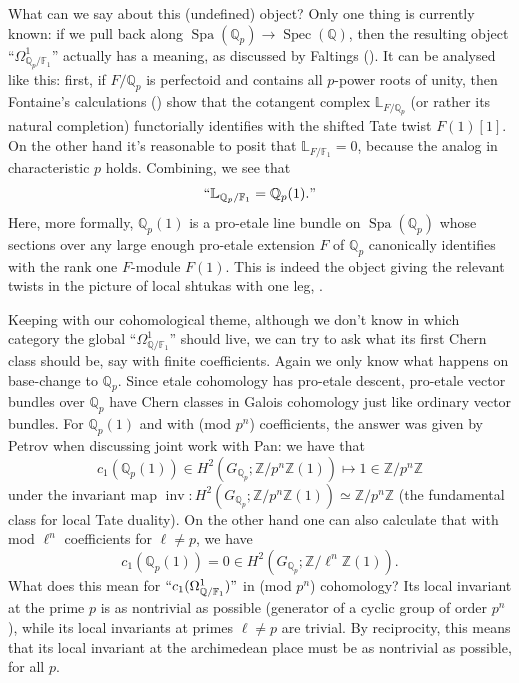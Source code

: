 \documentclass[12pt]{article}
\theoremstyle{definition}
\newcommand{\on}{\operatorname}
\newcommand{\mbb}{\mathbb}
\begin{document}
\begin{enumerate}
What can we say about this (undefined) object? Only one thing is currently known: if we pull back along $\on{Spa}(\mbb{Q}_p)\to \on{Spec}(\mbb{Q})$, then the resulting object ``$\Omega^1_{\mbb{Q}_p/\mbb{F}_1}$'' actually has a meaning, as discussed by Faltings (\cite{faltings}).  It can be analysed like this: first, if $F/\mbb{Q}_p$ is perfectoid and contains all $p$-power roots of unity, then Fontaine's calculations (\cite{fontaine}) show that the cotangent complex $\mbb{L}_{F/\mbb{Q}_p}$ (or rather its natural completion) functorially identifies with the shifted Tate twist $F(1)[1]$.  On the other hand it's reasonable to posit that $\mbb{L}_{F/\mbb{F}_1}=0$, because the analog in characteristic $p$ holds.  Combining, we see that
$$``\mbb{L}_{\mbb{Q}_p/\mbb{F}_1} = \mbb{Q}_p(1)."$$
Here, more formally, $\mbb{Q}_p(1)$ is a pro-etale line bundle on $\on{Spa}(\mbb{Q}_p)$ whose sections over any large enough pro-etale extension $F$ of $\mbb{Q}_p$ canonically identifies with the rank one $F$-module $F(1)$.  This is indeed the object giving the relevant twists in the picture of local shtukas with one leg, \cite{scholzeberkeley}.

Keeping with our cohomological theme, although we don't know in which category the global ``$\Omega^1_{\mbb{Q}/\mbb{F}_1}$'' should live, we can try to ask what its first Chern class should be, say with finite coefficients.  Again we only know what happens on base-change to $\mbb{Q}_p$.  Since etale cohomology has pro-etale descent, pro-etale vector bundles over $\mbb{Q}_p$ have Chern classes in Galois cohomology just like ordinary vector bundles.  For $\mbb{Q}_p(1)$ and with (mod $p^n$) coefficients, the answer was given by Petrov when discussing joint work with Pan: we have that
$$c_1(\mbb{Q}_p(1)) \in H^2(G_{\mbb{Q}_p};\mbb{Z}/p^n\mbb{Z}(1)) \mapsto 1 \in \mbb{Z}/p^n\mbb{Z}$$
under the invariant map $\on{inv}: H^2(G_{\mbb{Q}_p};\mbb{Z}/p^n\mbb{Z}(1))\simeq \mbb{Z}/p^n\mbb{Z}$ (the fundamental class for local Tate duality).  On the other hand one can also calculate that with mod $\ell^n$ coefficients for $\ell\neq p$, we have
$$c_1(\mbb{Q}_p(1)) = 0 \in H^2(G_{\mbb{Q}_p};\mbb{Z}/\ell^n\mbb{Z}(1)).$$
What does this mean for $``c_1(\Omega^1_{\mbb{Q}/\mbb{F}_1})"$ in (mod $p^n$) cohomology?  Its local invariant at the prime $p$ is as nontrivial as possible (generator of a cyclic group of order $p^n$), while its local invariants at primes $\ell\neq p$ are trivial.  By reciprocity, this means that its local invariant at the archimedean place must be as nontrivial as possible, for all $p$.


\end{enumerate}
\end{document}
